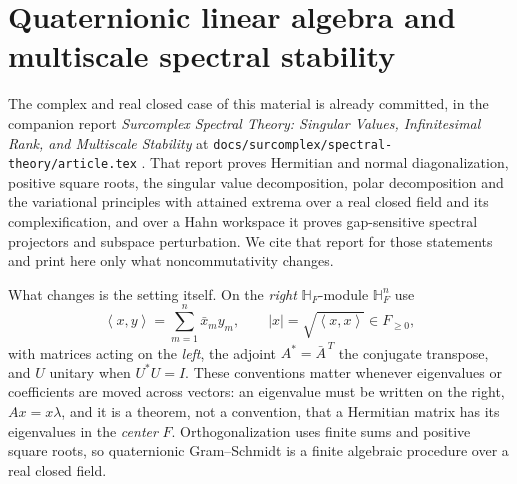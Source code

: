 \documentclass[11pt,letterpaper]{article}
\numberwithin{equation}{section}
\theoremstyle{definition}
\theoremstyle{remark}
\newcommand{\HF}{\mathbb H_F}
\newcommand{\abs}[1]{\left|#1\right|}
\newcommand{\angles}[1]{\left\langle#1\right\rangle}
\begin{document}
\section{Quaternionic linear algebra and multiscale spectral stability}\label{squat:sec:spectral}

The complex and real closed case of this material is already committed, in the companion
report \emph{Surcomplex Spectral Theory: Singular Values, Infinitesimal Rank, and
Multiscale Stability} at
\texttt{docs/surcomplex/\allowbreak spectral-theory/\allowbreak article.tex}
\cite{RepoSpec}. That report proves Hermitian and
normal diagonalization, positive square roots, the singular value decomposition, polar
decomposition and the variational principles with attained extrema over a real closed
field and its complexification, and over a Hahn workspace it proves gap-sensitive spectral
projectors and subspace perturbation. We cite that report for those statements and print
here only what noncommutativity changes.

What changes is the setting itself. On the \emph{right} $\HF$-module $\HF^n$ use
\[
 \angles{x,y}=\sum_{m=1}^n\bar x_my_m,\qquad \abs x=\sqrt{\angles{x,x}}\in F_{\ge0},
\]
with matrices acting on the \emph{left}, the adjoint $A^*=\bar A^{\,T}$ the conjugate
transpose, and $U$ unitary when $U^*U=I$. These conventions matter whenever eigenvalues or
coefficients are moved across vectors: an eigenvalue must be written on the right,
$Ax=x\lambda$, and it is a theorem, not a convention, that a Hermitian matrix has its
eigenvalues in the \emph{center} $F$. Orthogonalization uses finite sums and positive
square roots, so quaternionic Gram--Schmidt is a finite algebraic procedure over a real
closed field.
\end{document}

